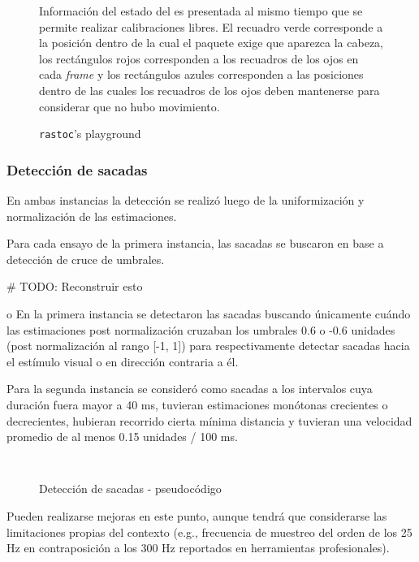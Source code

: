 \begin{figure}
    \centering
    \caption{\texttt{rastoc}’s playground}
    Información del estado del \eyetracker es presentada al mismo tiempo que se
    permite realizar calibraciones libres.
    El recuadro verde corresponde a la posición dentro de la cual el paquete
    \webgazer exige que aparezca la cabeza, los rectángulos rojos corresponden
    a los recuadros de los ojos en cada \textit{frame} y los rectángulos azules
    corresponden a las posiciones dentro de las cuales los recuadros de los
    ojos deben mantenerse para considerar que no hubo movimiento.
    \label{fig:rastoc-playground}
\end{figure}

\subsubsection{Detección de sacadas}

En ambas instancias la detección se realizó luego de la uniformización y
normalización de las estimaciones.

Para cada ensayo de la primera instancia, las sacadas se buscaron en base a
detección de cruce de umbrales.

# TODO: Reconstruir esto

o
En la primera instancia se detectaron las sacadas buscando únicamente cuándo
las estimaciones post normalización cruzaban los umbrales 0.6 o -0.6 unidades
(post normalización al rango [-1, 1]) para respectivamente detectar sacadas
hacia el estímulo visual o en dirección contraria a él.



Para la segunda instancia se consideró como sacadas a los intervalos cuya
duración fuera mayor a 40 ms, tuvieran estimaciones monótonas crecientes o
decrecientes, hubieran recorrido cierta mínima distancia y tuvieran una
velocidad promedio de al menos 0.15 unidades / 100 ms.

\begin{figure}
  \begin{verbatim}
  
  \end{verbatim}

  \caption{Detección de sacadas - pseudocódigo}
\end{figure}


Pueden realizarse mejoras en este punto, aunque tendrá que considerarse las
limitaciones propias del contexto (e.g., frecuencia de muestreo del orden de
los 25 Hz en contraposición a los 300 Hz reportados en herramientas
profesionales).

